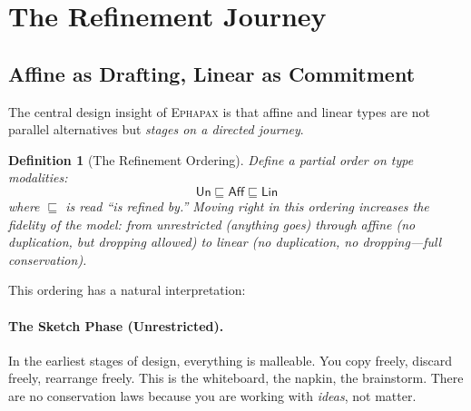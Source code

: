 \documentclass[11pt,a4paper]{article}
\newtheorem{definition}[theorem]{Definition}
\newcommand{\Linear}{\textsf{Lin}}
\newcommand{\Affine}{\textsf{Aff}}
\newcommand{\Unres}{\textsf{Un}}
\newcommand{\ephapax}{\textsc{Ephapax}}
\begin{document}
\section{The Refinement Journey}
\label{sec:refinement}

\subsection{Affine as Drafting, Linear as Commitment}

The central design insight of \ephapax{} is that affine and linear types
are not parallel alternatives but \emph{stages on a directed journey}.

\begin{definition}[The Refinement Ordering]
Define a partial order on type modalities:
\[
  \Unres \sqsubseteq \Affine \sqsubseteq \Linear
\]
where $\sqsubseteq$ is read ``is refined by.'' Moving right in this
ordering increases the fidelity of the model: from unrestricted
(anything goes) through affine (no duplication, but dropping allowed)
to linear (no duplication, no dropping---full conservation).
\end{definition}

This ordering has a natural interpretation:

\begin{center}
\end{center}

\paragraph{The Sketch Phase (Unrestricted).}
In the earliest stages of design, everything is malleable. You copy
freely, discard freely, rearrange freely. This is the whiteboard, the
napkin, the brainstorm. There are no conservation laws because you are
working with \emph{ideas}, not matter.
\end{document}

